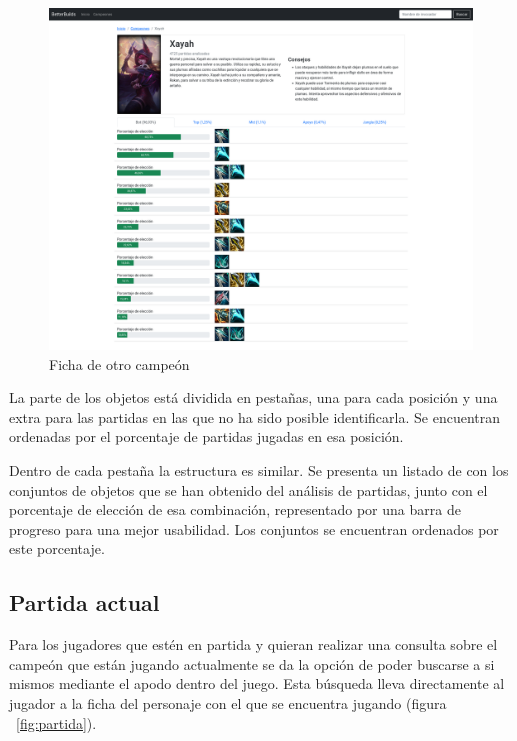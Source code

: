 \begin{figure}[h]
	\centering
	\includegraphics[width=1\linewidth]{img/4.campeon}
	\caption{Ficha de otro campeón}
	\label{fig:ficha2}
\end{figure}

La parte de los objetos está dividida en pestañas, una para cada posición y una extra para las partidas en las que no ha sido posible identificarla. Se encuentran ordenadas por el porcentaje de partidas jugadas en esa posición.

Dentro de cada pestaña la estructura es similar. Se presenta un listado de con los conjuntos de objetos que se han obtenido del análisis de partidas, junto con el porcentaje de elección de esa combinación, representado por una barra de progreso para una mejor usabilidad. Los conjuntos se encuentran ordenados por este porcentaje.

\subsection{Partida actual}\label{sec:partida}
Para los jugadores que estén en partida y quieran realizar una consulta sobre el campeón que están jugando actualmente se da la opción de poder buscarse a si mismos mediante el apodo dentro del juego. Esta búsqueda lleva directamente al jugador a la ficha del personaje con el que se encuentra jugando (figura ~\ref{fig:partida}).


